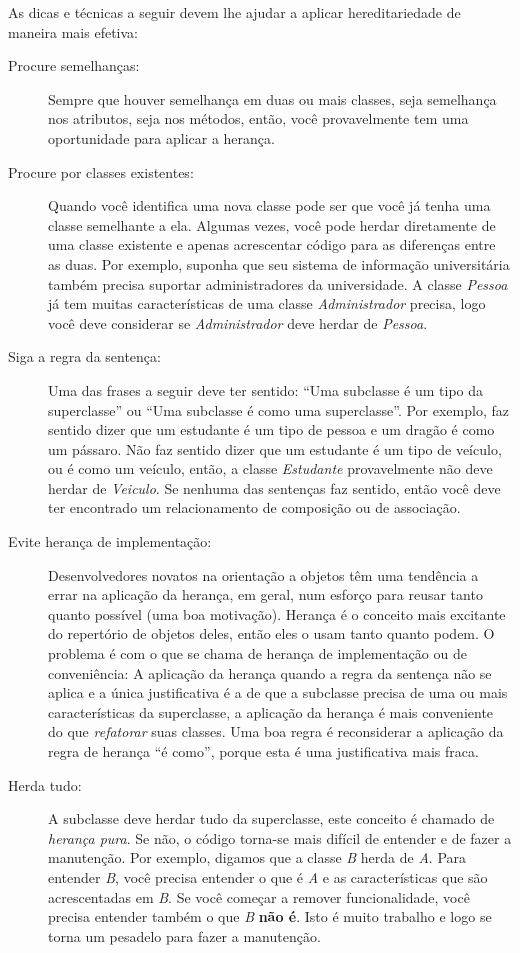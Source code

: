 \documentclass[
	11pt,				%
	openright,
	twoside,			%
	a4paper,			%
	english,			%
	french,
	brazil,				%
	sumario=tradicional
	]{abntex2}
\begin{document}
As dicas e técnicas a seguir devem lhe ajudar a aplicar hereditariedade de maneira mais efetiva:

\begin{description}
\item[Procure semelhanças:] Sempre que houver semelhança em duas ou mais classes, seja semelhança nos atributos, seja nos métodos, então, você provavelmente tem uma oportunidade para aplicar a herança.

\item[Procure por classes existentes:] Quando você identifica uma nova classe pode ser que você já tenha uma classe semelhante a ela. Algumas vezes, você pode herdar diretamente de uma classe existente e apenas acrescentar código para as diferenças entre as duas. Por exemplo, suponha que seu sistema de informação universitária também precisa suportar administradores da universidade. A classe \emph{Pessoa} já tem muitas características de uma classe \emph{Administrador} precisa, logo você deve considerar se \emph{Administrador} deve herdar de \emph{Pessoa}.

\item[Siga a regra da sentença:] Uma das frases a seguir deve ter sentido: ``Uma subclasse é um tipo da superclasse'' ou ``Uma subclasse é como uma superclasse''. Por exemplo, faz sentido dizer que um estudante é um tipo de pessoa e um dragão é como um pássaro. Não faz sentido dizer que um estudante é um tipo de veículo, ou é como um veículo, então, a classe \emph{Estudante} provavelmente não deve herdar de \emph{Veiculo}. Se nenhuma das sentenças faz sentido, então você deve ter encontrado um relacionamento de composição ou de associação.

\item[Evite herança de implementação:] Desenvolvedores novatos na orientação a objetos têm uma tendência a errar na aplicação da herança, em geral, num esforço para reusar tanto quanto possível (uma boa motivação). Herança é o conceito mais excitante do repertório de objetos deles, então eles o usam tanto quanto podem. O problema é com o que se chama de herança de implementação ou de conveniência: A aplicação da herança quando a regra da sentença não se aplica e a única justificativa é a de que a subclasse precisa de uma ou mais características da superclasse, a aplicação da herança é mais conveniente do que \textit{refatorar} suas classes. Uma boa regra é reconsiderar a aplicação da regra de herança ``é como'', porque esta é uma justificativa mais fraca.

\item[Herda tudo:] A subclasse deve herdar tudo da superclasse, este conceito é chamado de \emph{herança pura}. Se não, o código torna-se mais difícil de entender e de fazer a manutenção. Por exemplo, digamos que a classe \emph{B} herda de \emph{A}. Para entender \emph{B}, você precisa entender o que é \emph{A} e as características que são acrescentadas em \emph{B}. Se você começar a remover funcionalidade, você precisa entender também o que \emph{B} \textbf{não é}. Isto é muito trabalho e logo se torna um pesadelo para fazer a manutenção.

\end{description}
\end{document}
